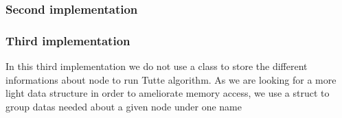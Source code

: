 \subsubsection{Second implementation}

\subsubsection{Third implementation}
In this third implementation we do not use a class to store the
different informations about node to run Tutte algorithm. 
As we are looking for a more light data structure in order to ameliorate 
memory access, we use a struct to group datas needed about a given node
under one name 


\newpage
